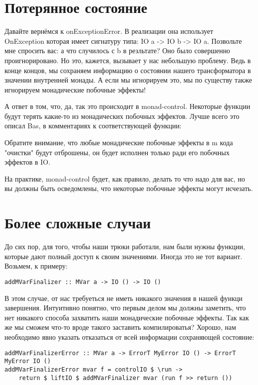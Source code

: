 \section{Потерянное состояние}

Давайте вернёмся к onExceptionError. В реализации она использует OnException которая имеет сигнатуру типа: IO a -> IO b -> IO a. Позвольте мне спросить вас: а что случилось с b в резльтате? Оно было совершенно проигнорировано. Но это, кажется, вызывает у нас небольшую проблему. Ведь в конце концов, мы сохраняем информацию о состоянии нашего трансформатора в значении внутренней монады. А если мы игнорируем это, мы по существу также игнорируем монадические побочные эффекты!

А ответ в том, что, да, так это происходит в monad-control. Некоторые функции будут терять какие-то из монадических побочных эффектов. Лучше всего это описал Bas, в комментариях к соответствующей функции:

Обратите внимание, что любые монадические побочные эффекты в m кода "очистки" будут отброшены, он будет исполнен только ради его побочных эффектов в IO.

На практике, monad-control будет, как правило, делать то что надо для вас, но вы должны быть осведомлены, что некоторые побочные эффекты могут исчезать.

\section{Более сложные случаи}

До сих пор, для того, чтобы наши трюки работали, нам были нужны функции, которые дают полный доступ к своим значениями. Иногда это не тот вариант. Возьмем, к примеру:

\begin{lstlisting}
addMVarFinalizer :: MVar a -> IO () -> IO ()
\end{lstlisting}

В этом случае, от нас требуеться не иметь никакого значения в нашей функци завершения. Интуитивно понятно, что первым делом мы должны заметить, что нет никакого способа захватить наши монадические побочные эффекты. Так как же мы сможем что-то вроде такого заставить компилироватья? Хорошо, нам необходимо явно указать отказаться от всей информации сохраняющей состояние:

\begin{lstlisting}
addMVarFinalizerError :: MVar a -> ErrorT MyError IO () -> ErrorT MyError IO ()
addMVarFinalizerError mvar f = controlIO $ \run ->
    return $ liftIO $ addMVarFinalizer mvar (run f >> return ())
\end{lstlisting}


